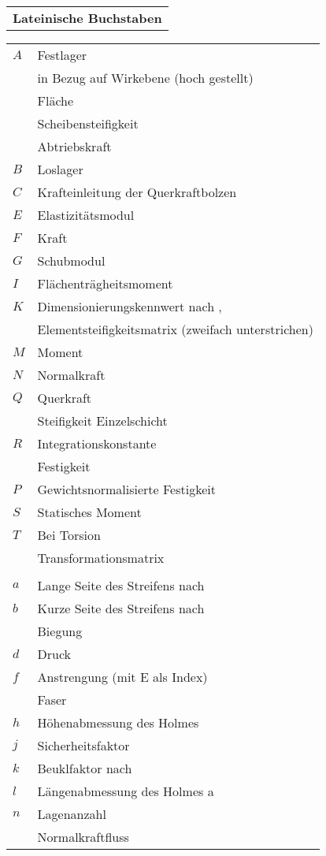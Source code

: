 \begin{longtable}[l]{l}
\onehalfspacing
\textbf{Lateinische Buchstaben}
\end{longtable}
\begin{longtable}[l]{ll}
\onehalfspacing
$ A $&Festlager\\
&in Bezug auf Wirkebene (hoch gestellt)\\
&Fläche\\
&Scheibensteifigkeit\\
&Abtriebskraft\\
$ B $&Loslager\\
$ C $&Krafteinleitung der Querkraftbolzen\\
$ E $&Elastizitätsmodul \\
$ F $&Kraft \\
$ G $&Schubmodul\\
$ I $&Flächenträgheitsmoment \\
$ K $&Dimensionierungskennwert nach \cite{item5},\\
 &Elementsteifigkeitsmatrix (zweifach unterstrichen)\\
 $M$&Moment\\
$N$& Normalkraft\\
$ Q $&Querkraft\\
&Steifigkeit Einzelschicht\\
$ R $&Integrationskonstante \\
&Festigkeit\\
$ P $&Gewichtsnormalisierte Festigkeit\\
$ S $&Statisches Moment\\
$ T $&Bei Torsion\\
&Transformationsmatrix\\
& \\
$ a $&Lange Seite des Streifens nach \cite{item1}\\
$ b $&Kurze Seite des Streifens nach \cite{item1}\\
&Biegung\\
$ d$& Druck\\
$ f $&Anstrengung (mit E als Index)\\
&Faser\\
$ h $&Höhenabmessung des Holmes \\
$ j $&Sicherheitsfaktor\\
$k$&Beuklfaktor nach \cite{item1}\\
$ l $&Längenabmessung des Holmes a\\
$ n $&Lagenanzahl\\
&Normalkraftfluss\\

\end{longtable}
